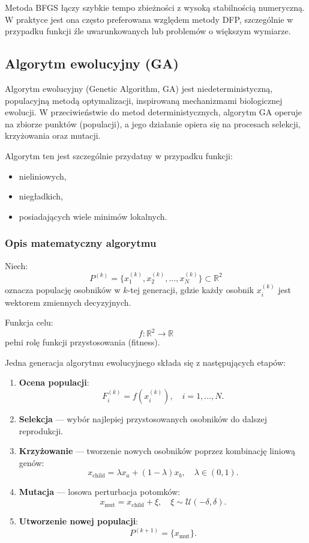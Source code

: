 \documentclass[10pt,a4paper]{article}
\begin{document}
Metoda BFGS łączy szybkie tempo zbieżności z wysoką stabilnością
numeryczną. W praktyce jest ona często preferowana względem metody DFP,
szczególnie w przypadku funkcji źle uwarunkowanych lub problemów
o większym wymiarze.


\subsection{Algorytm ewolucyjny (GA)}

Algorytm ewolucyjny (Genetic Algorithm, GA) jest niedeterministyczną,
populacyjną metodą optymalizacji, inspirowaną mechanizmami biologicznej
ewolucji. W przeciwieństwie do metod deterministycznych, algorytm GA
operuje na zbiorze punktów (populacji), a jego działanie opiera się na
procesach selekcji, krzyżowania oraz mutacji.

Algorytm ten jest szczególnie przydatny w przypadku funkcji:
\begin{itemize}
\item nieliniowych,
\item niegładkich,
\item posiadających wiele minimów lokalnych.
\end{itemize}



\subsubsection{Opis matematyczny algorytmu}

Niech:
\[
P^{(k)} = \{x_1^{(k)}, x_2^{(k)}, \dots, x_N^{(k)}\}
\subset \mathbb{R}^2
\]
oznacza populację osobników w $k$-tej generacji, gdzie każdy osobnik
$x_i^{(k)}$ jest wektorem zmiennych decyzyjnych.

Funkcja celu:
\[
f:\mathbb{R}^2 \to \mathbb{R}
\]
pełni rolę funkcji przystosowania (fitness).

Jedna generacja algorytmu ewolucyjnego składa się z następujących etapów:

\begin{enumerate}
\item \textbf{Ocena populacji}:
\[
F_i^{(k)} = f(x_i^{(k)}), \quad i=1,\dots,N.
\]

\item \textbf{Selekcja} — wybór najlepiej przystosowanych osobników
do dalszej reprodukcji.

\item \textbf{Krzyżowanie} — tworzenie nowych osobników poprzez
kombinację liniową genów:
\[
x_{\text{child}} = \lambda x_a + (1-\lambda)x_b,
\quad \lambda \in (0,1).
\]

\item \textbf{Mutacja} — losowa perturbacja potomków:
\[
x_{\text{mut}} = x_{\text{child}} + \xi,
\quad \xi \sim \mathcal{U}(-\delta,\delta).
\]

\item \textbf{Utworzenie nowej populacji}:
\[
P^{(k+1)} = \{x_{\text{mut}}\}.
\]
\end{enumerate}
\end{document}
